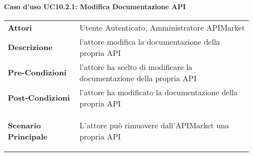 \paragraph{Caso d'uso UC10.2.1: Modifica Documentazione API}
\label{UC10.2.1}

\renewcommand*{\arraystretch}{1.6}
\begin{longtable}{ l | p{11cm}}
	\hline
	\rowcolor{Gray}
	\multicolumn{2}{c}{UC10.2.1: Modifica Documentazione API} \\
	\hline
	\textbf{Attori} &Utente Autenticato, Amministratore APIMarket \\
	\textbf{Descrizione} &  l'attore modifica la documentazione della propria API\\
	\textbf{Pre-Condizioni} & l'attore ha scelto di modificare la documentazione della propria API\\
	\textbf{Post-Condizioni}& l'attore ha modificato la documentazione della propria API\\
	\textbf{Scenario Principale} & \begin{enumerate*}[label=(\arabic*.),itemjoin={\newline}]
		\item L'attore può rimuovere dall'APIMarket una propria API
	\end{enumerate*}\\
\end{longtable}



